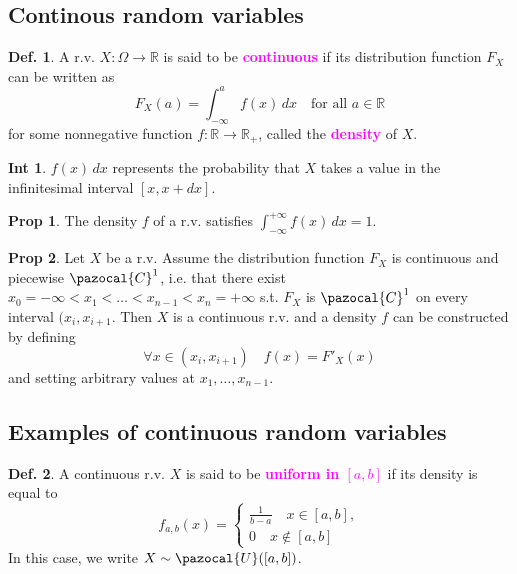 \documentclass[8pt,a4paper,landscape]{article}
\theoremstyle{definition}
\newtheorem{definition}{Def.}[section]
\theoremstyle{example}
\theoremstyle{intuition}
\newtheorem*{intuition}{Int}
\theoremstyle{definition}
\newtheorem{proposition}{Prop}[section]
\newcommand{\Ub}{\pazocal{U}}
\newcommand{\Cb}{\pazocal{C}}
\newcommand{\mydef}[1]{\textcolor{magenta}{\textbf{#1}}}
\begin{document}
\begin{multicols}{3}
		\subsection{Continous random variables}
			
			\begin{definition}
				A r.v. $X : \Omega \to \mathbb{R}$ is said to be \mydef{continuous} if its distribution function $F_X$ can be written as
				$$
				F_X(a) = \int_{-\infty}^{a} f(x)\, dx \quad \text{for all } a \in \mathbb{R}
				$$
				for some nonnegative function $f : \mathbb{R} \to \mathbb{R_+}$, called the \mydef{density} of $X$.
			\end{definition}

			\begin{intuition}
				$f(x)\, dx$ represents the probability that $X$ takes a value in the infinitesimal interval $\left[x, x + dx\right]$.
			\end{intuition}

			\begin{proposition}
				The density $f$ of a r.v. satisfies $\int_{-\infty}^{+\infty} f(x)\, dx = 1$.
			\end{proposition}

			\begin{proposition}
				Let $X$ be a r.v. Assume the distribution function $F_X$ is continuous and piecewise $\Cb^1$, i.e. that there exist $x_0 = -\infty < x_1 < \ldots < x_{n-1} < x_n = +\infty$ s.t. $F_X$ is $\Cb^1$ on every interval $(x_i, x_{i+1}$. Then $X$ is a continuous r.v. and a density $f$ can be constructed by defining 
				$$
					\forall x \in (x_i, x_{i+1}) \quad f(x) = F'_X(x)
				$$
				and setting arbitrary values at $x_1, \ldots, x_{n-1}$.
			\end{proposition}


		\subsection{Examples of continuous random variables}
				
			\begin{definition}
				A continuous r.v. $X$ is said to be \mydef{uniform in $\left[a,b\right]$} if its density is equal to 
				$$
					f_{a,b}(x) = \begin{cases}
						\frac{1}{b-a} \quad x \in \left[a,b\right], \\
						0 						\quad x \notin \left[a,b\right]
					\end{cases}
				$$
				In this case, we write $X \sim \Ub(\left[a,b\right])$.
			\end{definition}


\end{multicols}
\end{document}
